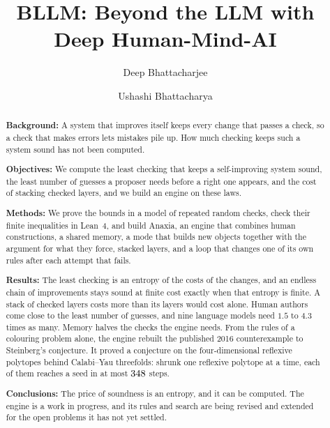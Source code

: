 \documentclass[manuscript,screen,review,acmthm=false]{jair}
\theoremstyle{plain}
\theoremstyle{definition}
\theoremstyle{plain}
\begin{document}
\title[BLLM]{BLLM: Beyond the LLM with Deep Human-Mind-AI}

\author{Deep Bhattacharjee}

\author{Ushashi Bhattacharya}

\renewcommand{\shortauthors}{Bhattacharjee \& Bhattacharya}

\begin{abstract}
{\bf Background:}
A system that improves itself keeps every change that passes a check, so a check that makes errors lets mistakes pile up. How much checking keeps such a system sound has not been computed.

{\bf Objectives:}
We compute the least checking that keeps a self-improving system sound, the least number of guesses a proposer needs before a right one appears, and the cost of stacking checked layers, and we build an engine on these laws.

{\bf Methods:}
We prove the bounds in a model of repeated random checks, check their finite inequalities in Lean~4, and build Anaxia, an engine that combines human constructions, a shared memory, a mode that builds new objects together with the argument for what they force, stacked layers, and a loop that changes one of its own rules after each attempt that fails.

{\bf Results:}
The least checking is an entropy of the costs of the changes, and an endless chain of improvements stays sound at finite cost exactly when that entropy is finite. A stack of checked layers costs more than its layers would cost alone. Human authors come close to the least number of guesses, and nine language models need $1.5$ to $4.3$ times as many. Memory halves the checks the engine needs. From the rules of a colouring problem alone, the engine rebuilt the published 2016 counterexample to Steinberg's conjecture. It proved a conjecture on the four-dimensional reflexive polytopes behind Calabi--Yau threefolds: shrunk one reflexive polytope at a time, each of them reaches a seed in at most $348$ steps.

{\bf Conclusions:}
The price of soundness is an entropy, and it can be computed. The engine is a work in progress, and its rules and search are being revised and extended for the open problems it has not yet settled.
\end{abstract}
\end{document}
